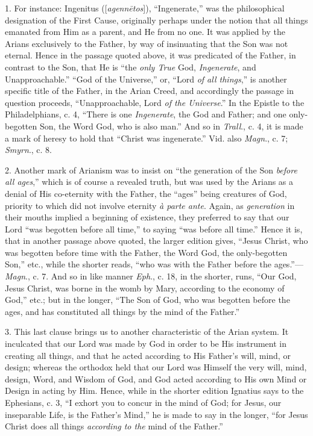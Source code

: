 1. For instance: Ingenitus ([\emph{agenn\={e}tos}]),
``Ingenerate,'' was the philosophical designation of the First Cause,
originally perhaps under the notion that all things emanated
from Him as a parent, and He from no one. It was applied by the Arians
exclusively to the Father, by way of insinuating that the Son was not
eternal. Hence in the passage quoted above, it was predicated of the
Father, in contrast to the Son, that He is ``the \emph{only True} God, \emph{Ingenerate},
and Unapproachable.'' ``God of the Universe,'' or, ``Lord \emph{of all things},''
is another specific title of the Father, in the Arian Creed, and
accordingly the passage in question proceeds, ``Unapproachable, Lord \emph{of
the Universe}.'' In the Epistle to the Philadelphians, c. 4, ``There
is one \emph{Ingenerate}, the God and Father; and one only-begotten
Son, the Word God, who is also man.'' And so in \emph{Trall}., c. 4, it
is made a mark of heresy to hold that ``Christ was ingenerate.'' Vid.
also \emph{Magn}., c. 7; \emph{Smyrn}., c. 8.

2. Another mark of Arianism
was to insist on ``the generation of the Son \emph{before all ages},''
which is of course a revealed truth, but was used by the Arians as a
denial of His co-eternity with the Father, the ``ages'' being creatures
of God, priority to which did not involve eternity \emph{à parte ante}.
Again, as \emph{generation} in their mouths implied a beginning of
existence, they preferred to say that our Lord ``was begotten before
all time,'' to saying ``was before all time.'' Hence it is, that in
another passage above quoted, the larger edition gives, ``Jesus Christ,
who was begotten before time with the Father, the Word God, the
only-begotten Son,'' etc., while the shorter reads, ``who was with the
Father before the ages.''—\emph{Magn}., c. 7. And so in like manner \emph{Eph}.,
c. 18, in the shorter, runs, ``Our God, Jesus Christ, was borne in the
womb by Mary, according to the economy of God,'' etc.; but in the
longer, ``The Son of God, who was begotten before the ages, and has
constituted all things by the mind of the Father.''

3. This last clause brings us
to another characteristic of the Arian system. It inculcated that our
Lord was made by God in order to be His instrument in creating all
things, and that he acted according to His Father's will, mind, or
design; whereas the orthodox held that our Lord was Himself the very
will, mind, design, Word, and Wisdom of God, and God acted according
to His own Mind or Design in acting by Him. Hence, while in the
shorter edition Ignatius says to the Ephesians, c. 3, ``I exhort you to
concur in the mind of God; for Jesus, our inseparable Life, is the
Father's Mind,'' he is made to say in the longer, ``for Jesus Christ
does all things \emph{according to the} mind of the Father.''

